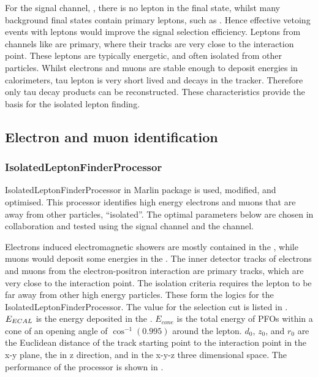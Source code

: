 For the signal channel, \eeToHHbbWWHad, there is no lepton in the final state, whilst many background final states contain primary leptons, such as \HepProcess{\Pquark \Pquark \Pquark \Pquark \Plepton \Pnu}. Hence effective vetoing events with leptons would improve the signal selection efficiency. Leptons from channels like \HepProcess{\Pquark \Pquark \Pquark \Pquark \Plepton \Pnu} are primary, where their tracks are very close to the interaction point. These leptons are typically energetic, and often isolated from other particles. Whilst electrons and muons are stable enough to deposit energies in calorimeters, tau lepton is very short lived and decays in the tracker. Therefore only tau decay products can be reconstructed. These characteristics provide the basis for the isolated lepton finding.


\subsection{Electron and muon identification}
\label{sec:doubleHiggsLeptonID}


\subsubsection{IsolatedLeptonFinderProcessor}
\label{sec:doubleHiggsIsolatedLeptonFinder}
IsolatedLeptonFinderProcessor in Marlin package is used, modified, and optimised. This processor identifies high energy electrons and muons that are away from other particles, ``isolated''. The optimal parameters below are chosen in collaboration and tested using the signal channel and the \eeTo{ \Pquark \Pquark \Pquark \Pquark \Plepton \Pnu} channel.

Electrons induced electromagnetic showers are mostly contained in the \ECAL, while muons would deposit some energies in the \ECAL. The inner detector tracks of electrons and muons from the electron-positron interaction are primary tracks, which are very close to the interaction point. The isolation criteria requires the lepton to be far away from other high energy particles. These form the logics for the IsolatedLeptonFinderProcessor. The value for the selection cut is listed in . $E_{ECAL}$ is the energy deposited in the \ECAL. $E_{cone}$ is the total energy of PFOs within a cone of an opening angle of $\cos^{-1}(0.995)$ around the lepton. $d_0$, $z_0$, and $r_0$ are the Euclidean distance of the track starting point to the interaction point in the x-y plane, the in z direction, and in the x-y-z three dimensional space. The performance of the processor is shown in .


